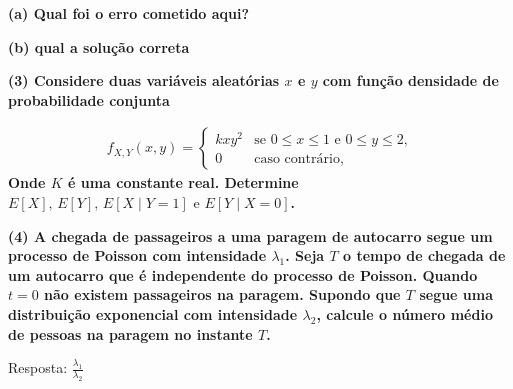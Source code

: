 \documentclass[12pt]{report}
\newenvironment{boldenv}
  {\bfseries}%
  {}%
\begin{document}
\begin{boldenv}
(a) Qual foi o erro cometido aqui?
\end{boldenv}

\begin{boldenv}
(b) qual a solução correta
\end{boldenv}

\vspace{\baselineskip}

\begin{boldenv}
(3) Considere duas variáveis aleatórias $x$ e $y$ com função densidade de probabilidade conjunta
\end{boldenv}

\begin{align*}
    f_{X, Y}(x, y) =
    \begin{cases}
        kxy^2 & \text{se } 0 \leq x \leq 1 \text{ e } 0 \leq y \leq 2\text{,}\\
        0     & \text{caso contrário, }
    \end{cases}
\end{align*}
\begin{boldenv}
Onde $K$ é uma constante real. Determine $E[X],\, E[Y],\, E[X \mid Y = 1] \text{ e } E[Y \mid X = 0]$.
\end{boldenv}

\vspace{\baselineskip}

\begin{boldenv}
(4) A chegada de passageiros a uma paragem de autocarro segue um processo de Poisson com intensidade $\lambda_1$. Seja $T$ o tempo de chegada de um autocarro que é independente do processo de Poisson. Quando $t = 0$ não existem passageiros na paragem. Supondo que $T$ segue uma distribuição exponencial com intensidade $\lambda_2$, calcule o número médio de pessoas na paragem no instante $T$.

Resposta: $\frac{\lambda_1}{\lambda_2}$
\end{boldenv}

\vspace{\baselineskip}

\end{document}
